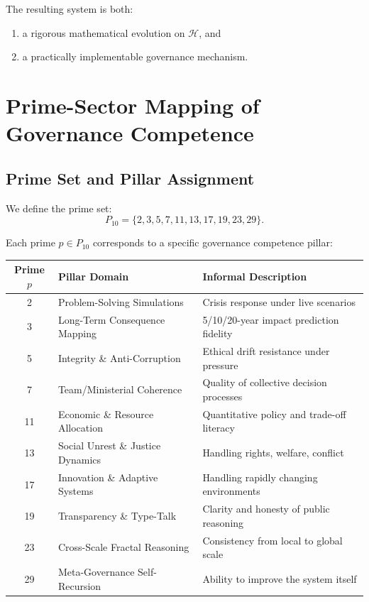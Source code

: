 \documentclass[11pt]{article}
\begin{document}
The resulting system is both:
\begin{enumerate}[leftmargin=1.5em]
    \item a rigorous mathematical evolution on \(\mathcal{H}\), and
    \item a practically implementable governance mechanism.
\end{enumerate}


\section{Prime-Sector Mapping of Governance Competence}

\subsection{Prime Set and Pillar Assignment}

We define the prime set:
\[
  P_{10} = \{2,3,5,7,11,13,17,19,23,29\}.
\]

Each prime \(p \in P_{10}\) corresponds to a specific governance competence pillar:

\begin{center}
\begin{tabular}{|c|l|l|}
\hline
Prime \(p\) & Pillar Domain & Informal Description \\
\hline
2 & Problem-Solving Simulations & Crisis response under live scenarios \\
3 & Long-Term Consequence Mapping & 5/10/20-year impact prediction fidelity \\
5 & Integrity \& Anti-Corruption & Ethical drift resistance under pressure \\
7 & Team/Ministerial Coherence & Quality of collective decision processes \\
11 & Economic \& Resource Allocation & Quantitative policy and trade-off literacy \\
13 & Social Unrest \& Justice Dynamics & Handling rights, welfare, conflict \\
17 & Innovation \& Adaptive Systems & Handling rapidly changing environments \\
19 & Transparency \& Type-Talk & Clarity and honesty of public reasoning \\
23 & Cross-Scale Fractal Reasoning & Consistency from local to global scale \\
29 & Meta-Governance Self-Recursion & Ability to improve the system itself \\
\hline
\end{tabular}
\end{center}
\end{document}
